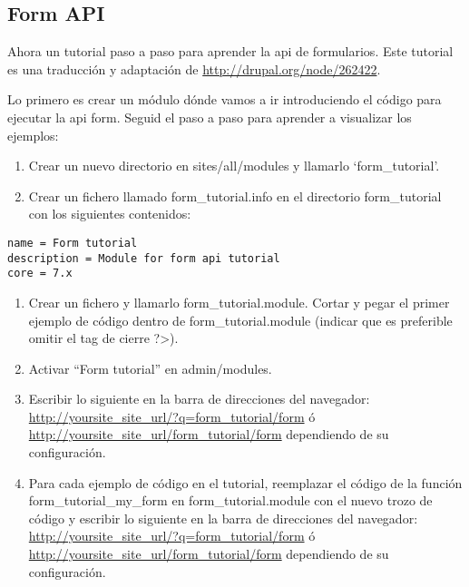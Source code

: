 \documentclass[11pt]{article}
\begin{document}
\subsection{Form API}
\label{sec-4.2}


Ahora un tutorial paso a paso para aprender la api de
formularios. Este tutorial es una traducción y adaptación de
\href{http://drupal.org/node/262422}{http://drupal.org/node/262422}.

Lo primero es crear un módulo dónde vamos a ir introduciendo el código
para ejecutar la api form. Seguid el paso a paso para aprender a
visualizar los ejemplos:

\begin{enumerate}
\item Crear un nuevo directorio en sites/all/modules y llamarlo `form\_tutorial'.
\item Crear un fichero llamado form\_tutorial.info en el directorio
   form\_tutorial con los siguientes contenidos:
\end{enumerate}
\begin{verbatim}
name = Form tutorial
description = Module for form api tutorial
core = 7.x
\end{verbatim}


\begin{enumerate}
\item Crear un fichero y llamarlo form\_tutorial.module. Cortar y pegar
   el primer ejemplo de código dentro de form\_tutorial.module (indicar
   que es preferible omitir el tag de cierre ?>).
\item Activar “Form tutorial” en admin/modules.
\item Escribir lo siguiente en la barra de direcciones del navegador:
   \href{http://yoursite_site_url/?q=form_tutorial/form}{http://yoursite\_site\_url/?q=form\_tutorial/form} ó
   \href{http://yoursite_site_url/form_tutorial/form}{http://yoursite\_site\_url/form\_tutorial/form} dependiendo de su
   configuración.
\item Para cada ejemplo de código en el tutorial, reemplazar el código
   de la función form\_tutorial\_my\_form en form\_tutorial.module con el
   nuevo trozo de código y escribir lo siguiente en la barra de
   direcciones del navegador:
   \href{http://yoursite_site_url/?q=form_tutorial/form}{http://yoursite\_site\_url/?q=form\_tutorial/form} ó
   \href{http://yoursite_site_url/form_tutorial/form}{http://yoursite\_site\_url/form\_tutorial/form} dependiendo de su
   configuración.
\end{enumerate}
\end{document}
